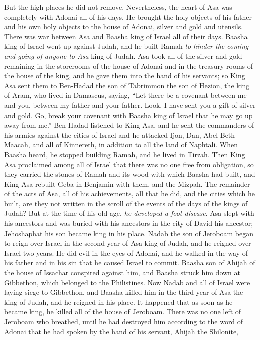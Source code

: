 \begin{biblechapter}
\verse But the high places he did not remove. Nevertheless, the heart of Asa was completely with Adonai all of his days.
\verse He brought the holy objects of his father and his own holy objects to the house of Adonai, silver and gold and utensils.
\verse There was war between Asa and Baasha king of Israel all of their days.
\verse Baasha king of Israel went up against Judah, and he built Ramah \textit{to hinder the coming and going of anyone to Asa} king of Judah.
\verse Asa took all of the silver and gold remaining in the storerooms of the house of Adonai and in the treasury rooms of the house of the king, and he gave them into the hand of his servants; so King Asa sent them to Ben-Hadad the son of Tabrimmon the son of Hezion, the king of Aram, who lived in Damascus, saying,
\verse “Let there be a covenant between me and you, between my father and your father. Look, I have sent you a gift of silver and gold. Go, break your covenant with Baasha king of Israel that he may go up away from me.”
\verse Ben-Hadad listened to King Asa, and he sent the commanders of his armies against the cities of Israel and he attacked Ijon, Dan, Abel-Beth-Maacah, and all of Kinnereth, in addition to all the land of Naphtali.
\verse When Baasha heard, he stopped building Ramah, and he lived in Tirzah.
\verse Then King Asa proclaimed among all of Israel that there was no one free from obligation, so they carried the stones of Ramah and its wood with which Baasha had built, and King Asa rebuilt Geba in Benjamin with them, and the Mizpah.
\verse The remainder of the acts of Asa, all of his achievements, all that he did, and the cities which he built, are they not written in the scroll of the events of the days of the kings of Judah? But at the time of his old age, \textit{he developed a foot disease}.
\verse Asa slept with his ancestors and was buried with his ancestors in the city of David his ancestor; Jehoshaphat his son became king in his place.
 Nadab the son of Jeroboam began to reign over Israel in the second year of Asa king of Judah, and he reigned over Israel two years.
\verse He did evil in the eyes of Adonai, and he walked in the way of his father and in his sin that he caused Israel to commit.
\verse Baasha son of Ahijah of the house of Issachar conspired against him, and Baasha struck him down at Gibbethon, which belonged to the Philistines. Now Nadab and all of Israel were laying siege to Gibbethon,
\verse and Baasha killed him in the third year of Asa the king of Judah, and he reigned in his place.
\verse It happened that as soon as he became king, he killed all of the house of Jeroboam. There was no one left of Jeroboam who breathed, until he had destroyed him according to the word of Adonai that he had spoken by the hand of his servant, Ahijah the Shilonite,

\end{biblechapter}
